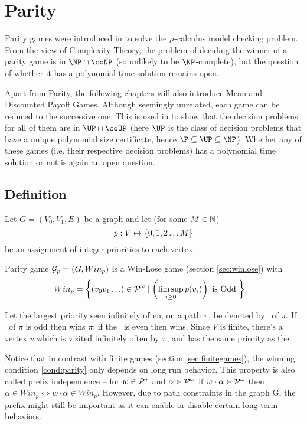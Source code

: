 \chapter{Parity}

Parity games were introduced in \cite{emersonjutla} to solve the $\mu$-calculus model checking problem. From the view of Complexity Theory, the problem of deciding the winner of a parity game is in $\NP \cap \coNP$ (so unlikely to be $\NP$-complete), but the question of whether it has a polynomial time solution remains open.

Apart from Parity, the following chapters will also introduce Mean and Discounted Payoff Games. Although seemingly unrelated, each game can be reduced to the successive one. This is used in \cite{parityup} to show that the decision problems for all of them are in $\UP \cap \coUP$ (here $\UP$ is the class of decision problems that have a unique polynomial size certificate, hence $\P \subseteq \UP \subseteq \NP$). Whether any of these games (i.e. their respective decision problems) has a polynomial time solution or not is again an open question.

\section{Definition}
Let $G=(V_0,V_1,E)$ be a graph and let (for some $M \in \mathbb{N}$)
\[
    p : V \mapsto \left\{0,1,2 \ldots M\right\}
\]
be an assignment of integer priorities to each vertex.

Parity game $\mathcal{G}_p=(G,Win_p)$ is a Win-Lose game (section \ref{sec:winlose}) with
\begin{align}
    Win_p &= \left\{ \left(v_0 v_1 \ldots\right) \in \mathcal{P}^\omega \mid \left(\limsup_{i \geq 0} p(v_i)\right)  \text{ is Odd }\right\} \label{cond:parity}
\end{align}

Let the largest priority seen infinitely often, on a path $\pi$, be denoted by \mip\ of $\pi$. If \mip\ of $\pi$ is odd then  wins $\pi$; if the \mip\ is even then  wins. Since $V$ is finite, there's a vertex $v$ which is visited infinitely often by $\pi$, and has the same priority as the \mip.

Notice that in contrast with finite games (section \ref{sec:finitegames}), the winning condition \eqref{cond:parity} only depends on long run behavior. This property is also called prefix independence -- for $w \in \mathcal{P}^{*}$ and $\alpha \in \mathcal{P}^\omega$ if $w \cdot \alpha \in \mathcal{P}^\omega$ then $\alpha \in Win_p \iff w \cdot \alpha \in Win_p$. However, due to path constraints in the graph G, the prefix might still be important as it can enable or disable certain long term behaviors.


